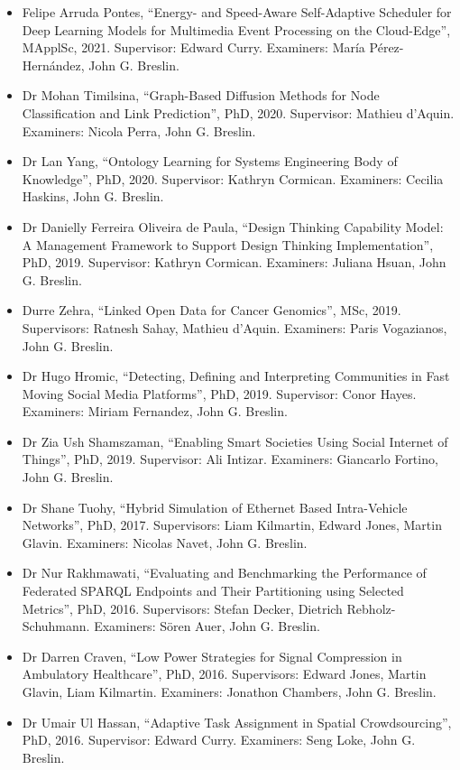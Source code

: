 \documentclass[10pt,a4paper]{res} %
\begin{document}
\begin{resume}
\begin{itemize}
\item Felipe Arruda Pontes, ``Energy- and Speed-Aware Self-Adaptive Scheduler for Deep Learning Models for Multimedia Event Processing on the Cloud-Edge'', MApplSc, 2021. Supervisor: Edward Curry. Examiners: Mar\'{i}a P\'{e}rez-Hern\'{a}ndez, John G. Breslin.
\item Dr Mohan Timilsina, ``Graph-Based Diffusion Methods for Node Classification and Link Prediction'', PhD, 2020. Supervisor: Mathieu d'Aquin. Examiners: Nicola Perra, John G. Breslin.
\item Dr Lan Yang, ``Ontology Learning for Systems Engineering Body of Knowledge'', PhD, 2020. Supervisor: Kathryn Cormican. Examiners: Cecilia Haskins, John G. Breslin.
\item Dr Danielly Ferreira Oliveira de Paula, ``Design Thinking Capability Model: A Management Framework to Support Design Thinking Implementation'', PhD, 2019. Supervisor: Kathryn Cormican. Examiners: Juliana Hsuan, John G. Breslin.
\item Durre Zehra, ``Linked Open Data for Cancer Genomics'', MSc, 2019. Supervisors: Ratnesh Sahay, Mathieu d'Aquin. Examiners: Paris Vogazianos, John G. Breslin.
\item Dr Hugo Hromic, ``Detecting, Defining and Interpreting Communities in Fast Moving Social Media Platforms'', PhD, 2019. Supervisor: Conor Hayes. Examiners: Miriam Fernandez, John G. Breslin.
\item Dr Zia Ush Shamszaman, ``Enabling Smart Societies Using Social Internet of Things'', PhD, 2019. Supervisor: Ali Intizar. Examiners: Giancarlo Fortino, John G. Breslin.
\item Dr Shane Tuohy, ``Hybrid Simulation of Ethernet Based Intra-Vehicle Networks'', PhD, 2017. Supervisors: Liam Kilmartin, Edward Jones, Martin Glavin. Examiners: Nicolas Navet, John G. Breslin.
\item Dr Nur Rakhmawati, ``Evaluating and Benchmarking the Performance of Federated SPARQL Endpoints and Their Partitioning using Selected Metrics'', PhD, 2016. Supervisors: Stefan Decker, Dietrich Rebholz-Schuhmann. Examiners: S\"{o}ren Auer, John G. Breslin.
\item Dr Darren Craven, ``Low Power Strategies for Signal Compression in Ambulatory Healthcare'', PhD, 2016. Supervisors: Edward Jones, Martin Glavin, Liam Kilmartin. Examiners: Jonathon Chambers, John G. Breslin.
\item Dr Umair Ul Hassan, ``Adaptive Task Assignment in Spatial Crowdsourcing'', PhD, 2016. Supervisor: Edward Curry. Examiners: Seng Loke, John G. Breslin.

\end{itemize}
\end{resume}
\end{document}
